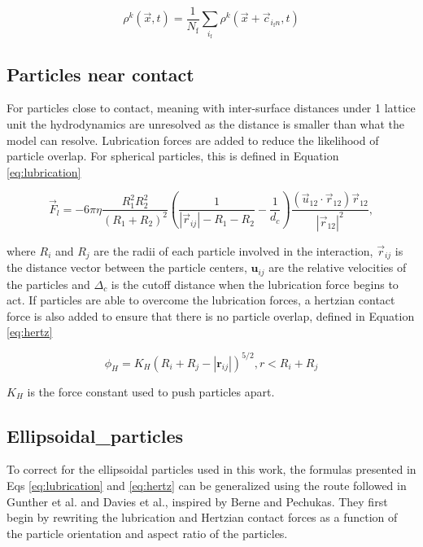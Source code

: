 \begin{equation}
    \rho^k(\vec{x},t) = \frac{1}{N_{\text{f}}} \sum_{i_{\text{f}}} \rho^k(\vec{x}+\vec{c}_{i_{\text{f}}n}, t)
    \label{eq:fill_particles}
\end{equation}

\subsection{Particles near contact}
\label{section:particles_near_contact}

For particles close to contact, meaning with inter-surface distances under 1 lattice unit the hydrodynamics are unresolved as the
distance is smaller than what the model can resolve. Lubrication forces are added to reduce the likelihood of particle overlap. For 
spherical particles, this is defined in Equation \eqref{eq:lubrication}

\begin{equation}
    \vec{F}_l = -6 \pi \eta \frac{R_1^2 R_2^2}{\left(R_1+R_2\right)^2}\left(\frac{1}{|\vec{r}_{ij}|-R_1-R_2}-\frac{1}{d_c}\right) \frac{\left(\vec{u}_{12}\cdot\vec{r}_{12}\right)\vec{r}_{12}}{|\vec{r}_{12}|^2} ,%
    \label{eq:lubrication}
\end{equation}

where $R_i$ and $R_j$ are the radii of each particle involved in the interaction, $\vec{r}_{ij}$ is the distance
vector between the particle centers, $\mathbf{u}_{ij}$ are the relative velocities of the particles and $\Delta_c$ 
is the cutoff distance when the lubrication force begins to act. If particles are able to overcome the lubrication forces, 
a hertzian contact force is also added to ensure that there is no particle overlap, defined in Equation \eqref{eq:hertz}

\begin{equation}
    \phi_{H} = K_{H}(R_i + R_j - |\mathbf{r}_{ij}|)^{5/2}, r < R_i + R_j
    \label{eq:hertz}
\end{equation}

$K_H$ is the force constant used to push particles apart. 

\subsection{Ellipsoidal_particles}
\label{section:ellipsoidal_particles}

To correct for the ellipsoidal particles used in this work, 
the formulas presented in Eqs \ref{eq:lubrication} and \ref{eq:hertz} can be generalized using the route followed 
in Gunther et al. and Davies et al., inspired by Berne and Pechukas. \cite{gunther_timescales_2014, davies_interface_2014} 
They first begin by rewriting the lubrication and Hertzian contact forces as a function of the particle orientation and 
aspect ratio of the particles.

